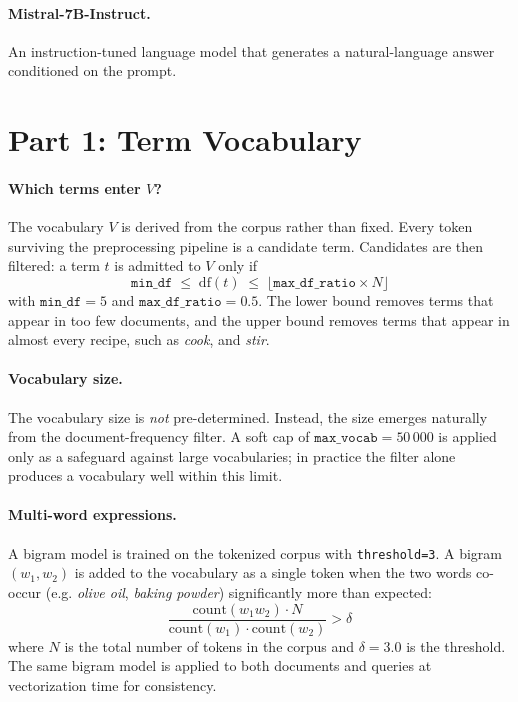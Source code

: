 \documentclass[a4paper,11pt]{article}
\begin{document}
\paragraph{Mistral-7B-Instruct.}
An instruction-tuned language model \parencite{jiang_mistral_2023} that generates a natural-language answer conditioned on the prompt.
\section*{Part 1: Term Vocabulary}

\paragraph{Which terms enter $V$? }
The vocabulary $V$ is derived from the corpus rather than fixed. Every token surviving the preprocessing pipeline is a candidate term. Candidates are then filtered: a term $t$ is admitted to $V$ only if
\[
    \texttt{min\_df} \;\leq\; \mathrm{df}(t) \;\leq\; \lfloor\texttt{max\_df\_ratio} \times N\rfloor
\]
with $\texttt{min\_df} = 5$ and $\texttt{max\_df\_ratio} = 0.5$. The lower bound removes terms that appear in too few documents, and the upper bound removes terms that appear in almost every recipe, such as \textit{cook}, and \textit{stir}.

\paragraph{Vocabulary size.}
The vocabulary size is \emph{not} pre-determined. Instead, the size emerges naturally from the document-frequency filter. A soft cap of $\texttt{max\_vocab} = 50\,000$ is applied only as a safeguard against large vocabularies; in practice the filter alone produces a vocabulary well within this limit.

\paragraph{Multi-word expressions.}
A bigram model is trained on the tokenized corpus with \texttt{threshold=3}. A bigram $(w_1, w_2)$ is added to the vocabulary as a single token when the two words co-occur (e.g. \textit{olive oil}, \textit{baking powder}) significantly more than expected:
\[
    \frac{\mathrm{count}(w_1 w_2) \cdot N}{\mathrm{count}(w_1) \cdot \mathrm{count}(w_2)} > \delta
\]
where $N$ is the total number of tokens in the corpus and $\delta = 3.0$ is the threshold. The same bigram model is applied to both documents and queries at vectorization time for consistency.
\end{document}
